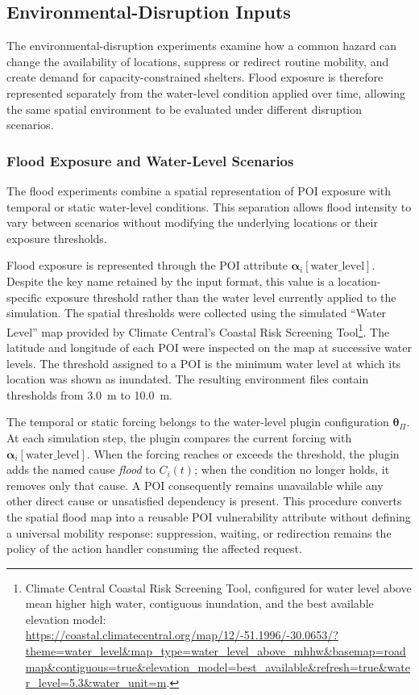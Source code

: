\subsection{Environmental-Disruption Inputs}

The environmental-disruption experiments examine how a common hazard can change the availability of locations, suppress or redirect routine mobility, and create demand for capacity-constrained shelters. Flood exposure is therefore represented separately from the water-level condition applied over time, allowing the same spatial environment to be evaluated under different disruption scenarios.

\subsubsection{Flood Exposure and Water-Level Scenarios}
\label{sec:flood_water_input_data}

The flood experiments combine a spatial representation of POI exposure with temporal or static water-level conditions. This separation allows flood intensity to vary between scenarios without modifying the underlying locations or their exposure thresholds.

Flood exposure is represented through the POI attribute $\bm{\alpha}_i[\mathrm{water\_level}]$. Despite the key name retained by the input format, this value is a location-specific exposure threshold rather than the water level currently applied to the simulation. The spatial thresholds were collected using the simulated ``Water Level'' map provided by Climate Central's Coastal Risk Screening Tool\footnote{Climate Central Coastal Risk Screening Tool, configured for water level above mean higher high water, contiguous inundation, and the best available elevation model: \url{https://coastal.climatecentral.org/map/12/-51.1996/-30.0653/?theme=water_level&map_type=water_level_above_mhhw&basemap=roadmap&contiguous=true&elevation_model=best_available&refresh=true&water_level=5.3&water_unit=m}.}. The latitude and longitude of each POI were inspected on the map at successive water levels. The threshold assigned to a POI is the minimum water level at which its location was shown as inundated. The resulting environment files contain thresholds from 3.0~m to 10.0~m.

The temporal or static forcing belongs to the water-level plugin configuration $\bm{\theta}_{\Pi}$. At each simulation step, the plugin compares the current forcing with $\bm{\alpha}_i[\mathrm{water\_level}]$. When the forcing reaches or exceeds the threshold, the plugin adds the named cause \textit{flood} to $C_i(t)$; when the condition no longer holds, it removes only that cause. A POI consequently remains unavailable while any other direct cause or unsatisfied dependency is present. This procedure converts the spatial flood map into a reusable POI vulnerability attribute without defining a universal mobility response: suppression, waiting, or redirection remains the policy of the action handler consuming the affected request.

